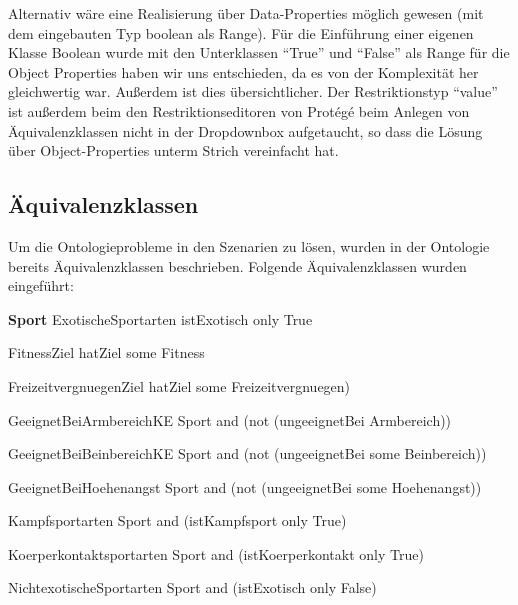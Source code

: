 Alternativ w\"are eine Realisierung \"uber Data-Properties m\"oglich gewesen (mit dem eingebauten Typ boolean als Range). F\"ur die Einf\"uhrung einer eigenen Klasse Boolean wurde mit den Unterklassen "`True"' und "`False"' als Range f\"ur die Object Properties haben wir uns entschieden, da es von der Komplexit\"at her gleichwertig war. Außerdem ist dies \"ubersichtlicher. Der Restriktionstyp "`value"' ist außerdem beim den Restriktionseditoren von Protégé beim Anlegen von \"Aquivalenzklassen nicht in der Dropdownbox aufgetaucht, so dass die L\"osung \"uber Object-Properties unterm Strich vereinfacht hat.


\subsection{\"Aquivalenzklassen}

Um die Ontologieprobleme in den Szenarien zu l\"osen, wurden in der Ontologie bereits \"Aquivalenzklassen beschrieben. Folgende \"Aquivalenzklassen wurden eingef\"uhrt:


\textbf{Sport}
ExotischeSportarten  
	istExotisch only True
	
FitnessZiel
	hatZiel some Fitness
	
FreizeitvergnuegenZiel
	hatZiel some  Freizeitvergnuegen)
	
GeeignetBeiArmbereichKE
	Sport and (not (ungeeignetBei Armbereich))
	
GeeignetBeiBeinbereichKE
	Sport and (not (ungeeignetBei some Beinbereich))
	
GeeignetBeiHoehenangst
	Sport and (not (ungeeignetBei some Hoehenangst))
	
Kampfsportarten 
	Sport and (istKampfsport only True)
	
Koerperkontaktsportarten 
	Sport and (istKoerperkontakt only True)
	
NichtexotischeSportarten 
	Sport and (istExotisch only False)
	
